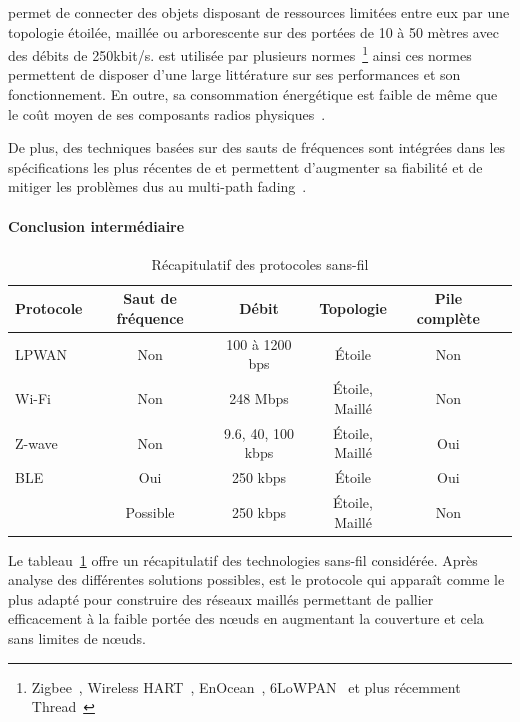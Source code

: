 \ieee{} permet de connecter des objets disposant de ressources limitées entre eux par une topologie étoilée, maillée ou arborescente sur des portées de 10 à 50 mètres avec des débits de 250kbit/s.
\ieee{} est utilisée par plusieurs normes~\footnote{Zigbee~\cite{alliance2006zigbee, zigbeeCritic}, Wireless HART~\cite{lennvall2008comparison}, EnOcean~\cite{ploennigs2010performance}, \ac{6LoWPAN}~\cite{shelby20116lowpan} et plus récemment Thread~\cite{threadCritic}} ainsi ces normes permettent de disposer d'une large littérature sur ses performances et son fonctionnement.
En outre, sa consommation énergétique est faible de même que le coût moyen de ses composants radios physiques~\cite{vilajosana2015openmote}.

De plus, des techniques basées sur des sauts de fréquences sont intégrées dans les spécifications les plus récentes de \ieee{} et permettent d'augmenter sa fiabilité et de mitiger les problèmes dus au multi-path fading~\cite{6tisch}.

\paragraph{Conclusion intermédiaire}

\begin{table}[t]
\centering
\begin{tabular}{|l|c|c|c|c|c|}
\hline
Protocole & Saut de fréquence & Débit & Topologie & Pile complète \\
\hline
LPWAN & Non & 100 à 1200 bps & Étoile & Non \\
\hline
Wi-Fi & Non & 248 Mbps & Étoile, Maillé & Non \\
\hline
Z-wave & Non & 9.6, 40, 100 kbps & Étoile, Maillé &  Oui \\
\hline
\ac{BLE} & Oui & 250 kbps & Étoile & Oui \\
\hline
\ieee{} & Possible & 250 kbps & Étoile, Maillé & Non \\
\hline
\end{tabular}
\caption{Récapitulatif des protocoles sans-fil}

\label{gw:table:protocol_recap}
\end{table}

Le tableau~\ref{gw:table:protocol_recap} offre un récapitulatif des technologies sans-fil considérée.
Après analyse des différentes solutions possibles, \ieee{} est le protocole qui apparaît comme le plus adapté pour construire des réseaux maillés permettant de pallier efficacement à la faible portée des nœuds en augmentant la couverture et cela sans limites de nœuds.


